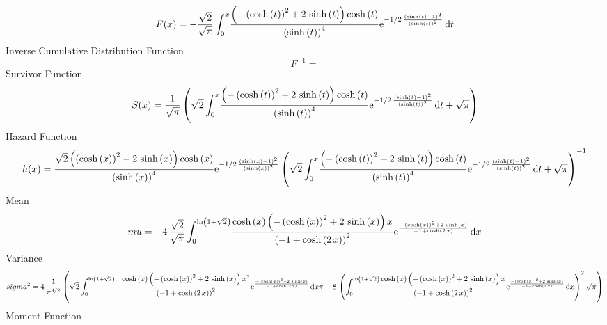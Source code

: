 \documentclass[12pt]{article}
\begin{document}
 $$F(x)=-{\frac {\sqrt {2}}{\sqrt {\pi}}\int_{0}^{x}\!{\frac { \left( -
 \left( \cosh \left( t \right)  \right) ^{2}+2\,\sinh \left( t
 \right)  \right) \cosh \left( t \right) }{ \left( \sinh \left( t
 \right)  \right) ^{4}}{{\rm e}^{-1/2\,{\frac { \left( \sinh \left( t
 \right) -1 \right) ^{2}}{ \left( \sinh \left( t \right)  \right) ^{2}
}}}}}\,{\rm d}t}
$$ Inverse Cumulative Distribution Function 
  $$F^{-1} = $$Survivor Function 
 $$ S(x)={\frac {1}{\sqrt {\pi}} \left( \sqrt {2}\int_{0}^{x}\!{\frac { \left( 
- \left( \cosh \left( t \right)  \right) ^{2}+2\,\sinh \left( t
 \right)  \right) \cosh \left( t \right) }{ \left( \sinh \left( t
 \right)  \right) ^{4}}{{\rm e}^{-1/2\,{\frac { \left( \sinh \left( t
 \right) -1 \right) ^{2}}{ \left( \sinh \left( t \right)  \right) ^{2}
}}}}}\,{\rm d}t+\sqrt {\pi} \right) }
$$ Hazard Function 
 $$ h(x)={\frac {\sqrt {2} \left(  \left( \cosh \left( x \right)  \right) ^{2}-
2\,\sinh \left( x \right)  \right) \cosh \left( x \right) }{ \left( 
\sinh \left( x \right)  \right) ^{4}}{{\rm e}^{-1/2\,{\frac { \left( 
\sinh \left( x \right) -1 \right) ^{2}}{ \left( \sinh \left( x
 \right)  \right) ^{2}}}}} \left( \sqrt {2}\int_{0}^{x}\!{\frac {
 \left( - \left( \cosh \left( t \right)  \right) ^{2}+2\,\sinh \left( 
t \right)  \right) \cosh \left( t \right) }{ \left( \sinh \left( t
 \right)  \right) ^{4}}{{\rm e}^{-1/2\,{\frac { \left( \sinh \left( t
 \right) -1 \right) ^{2}}{ \left( \sinh \left( t \right)  \right) ^{2}
}}}}}\,{\rm d}t+\sqrt {\pi} \right) ^{-1}}
$$Mean 
 $$ mu=-4\,{\frac {\sqrt {2}}{\sqrt {\pi}}\int_{0}^{\ln  \left( 1+\sqrt {2}
 \right) }\!{\frac {\cosh \left( x \right)  \left( - \left( \cosh
 \left( x \right)  \right) ^{2}+2\,\sinh \left( x \right)  \right) x}{
 \left( -1+\cosh \left( 2\,x \right)  \right) ^{2}}{{\rm e}^{{\frac {-
 \left( \cosh \left( x \right)  \right) ^{2}+2\,\sinh \left( x
 \right) }{-1+\cosh \left( 2\,x \right) }}}}}\,{\rm d}x}
$$ Variance 
 $$ sigma^2 = 4\,{\frac {1}{{\pi}^{3/2}} \left( \sqrt {2}\int_{0}^{\ln  \left( 1+
\sqrt {2} \right) }\!-{\frac {\cosh \left( x \right)  \left( - \left( 
\cosh \left( x \right)  \right) ^{2}+2\,\sinh \left( x \right) 
 \right) {x}^{2}}{ \left( -1+\cosh \left( 2\,x \right)  \right) ^{2}}{
{\rm e}^{{\frac {- \left( \cosh \left( x \right)  \right) ^{2}+2\,
\sinh \left( x \right) }{-1+\cosh \left( 2\,x \right) }}}}}\,{\rm d}x
\pi-8\, \left( \int_{0}^{\ln  \left( 1+\sqrt {2} \right) }\!{\frac {
\cosh \left( x \right)  \left( - \left( \cosh \left( x \right) 
 \right) ^{2}+2\,\sinh \left( x \right)  \right) x}{ \left( -1+\cosh
 \left( 2\,x \right)  \right) ^{2}}{{\rm e}^{{\frac {- \left( \cosh
 \left( x \right)  \right) ^{2}+2\,\sinh \left( x \right) }{-1+\cosh
 \left( 2\,x \right) }}}}}\,{\rm d}x \right) ^{2}\sqrt {\pi} \right) }
$$Moment Function 
\end{document}
